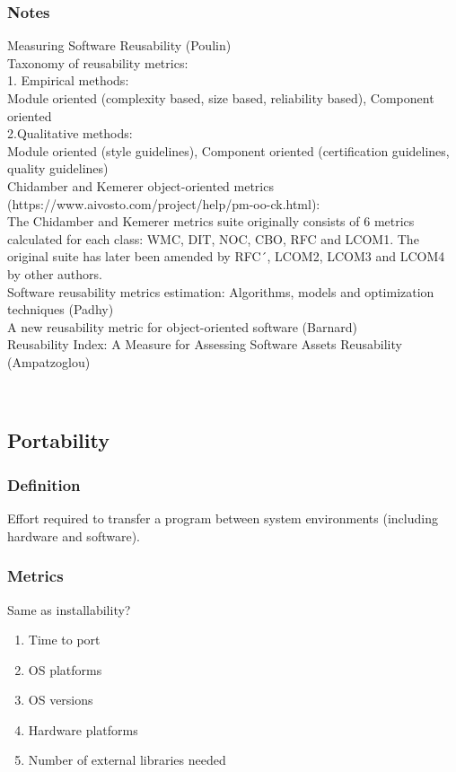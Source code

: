 \documentclass{article}
\begin{document}
\subsubsection{Notes}
\noindent Measuring Software Reusability (Poulin)\\  

Taxonomy of reusability metrics:\\
1. Empirical methods:\\
Module oriented (complexity based, size based, reliability based), 
Component oriented\\

2.Qualitative methods:\\
Module oriented (style guidelines), Component oriented (certification guidelines, quality guidelines)\\

\noindent Chidamber and Kemerer object-oriented metrics (https://www.aivosto.com/project/help/pm-oo-ck.html):\\
The Chidamber and Kemerer metrics suite originally consists of 6 metrics calculated for each class: WMC, DIT, NOC, CBO, RFC and LCOM1. The original suite has later been amended by RFC´, LCOM2, LCOM3 and LCOM4 by other authors.\\ 

\noindent Software reusability metrics estimation: Algorithms, models and optimization techniques (Padhy)\\ 

\noindent A new reusability metric for object-oriented software (Barnard)\\ 

\noindent Reusability Index: A Measure for Assessing Software Assets Reusability (Ampatzoglou) 

~\newpage
\subsection{Portability}
\subsubsection{Definition}
Effort required to transfer a program between system environments (including hardware and software).\\
\subsubsection{Metrics}
Same as installability?
\begin{enumerate}
	\item Time to port
	\item OS platforms
	\item OS versions
	\item Hardware platforms
	\item Number of external libraries needed
\end{enumerate}
\end{document}
